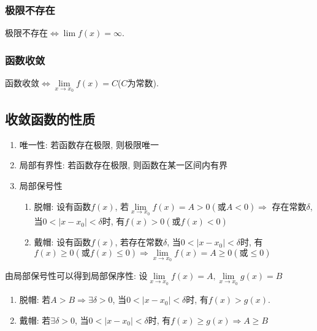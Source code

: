 \subsubsection{极限不存在}
极限不存在$ \Leftrightarrow \lim\limits f(x)=\infty $.
\subsubsection{函数收敛}
函数收敛$ \Leftrightarrow \lim\limits_{x \rightarrow x_{0}}f(x)=C $($ C $为常数).
\subsection{收敛函数的性质}
\begin{enumerate}
\item 唯一性: 若函数存在极限, 则极限唯一
\item 局部有界性: 若函数存在极限, 则函数在某一区间内有界
\item 局部保号性
\begin{enumerate}
\item 脱帽: 设有函数$ f(x) $, 若$ \lim\limits_{x\rightarrow x_{0}}f(x)=A>0(\text{或}A<0) \Rightarrow $ 存在常数$ \delta $, 当$ 0<|x-x_{0}|<\delta $时, 有$ f(x)>0(\text{或}f(x)<0) $
\item 戴帽: 设有函数$ f(x) $, 若存在常数$ \delta $, 当$ 0<|x-x_{0}|<\delta $时, 有$ f(x)\ge 0(\text{或}f(x)\le 0) \Rightarrow \lim\limits_{x\rightarrow x_{0}}f(x)=A\ge 0(\text{或}\le 0) $
\end{enumerate}
\end{enumerate}
\begin{tcolorbox}
由局部保号性可以得到局部保序性: 设$ \lim\limits_{x \rightarrow x_{0}}f(x)=A, \lim\limits_{x \rightarrow x_{0}}g(x)=B $
\begin{enumerate}
\item 脱帽: 若$ A>B\Rightarrow \exists \delta>0 $, 当$ 0<|x-x_{0}|<\delta $时, 有$ f(x)>g(x) $.
\item 戴帽: 若$ \exists \delta>0 $, 当$ 0<|x-x_{0}|<\delta $时, 有$ f(x)\ge g(x)\Rightarrow A\ge B $
\end{enumerate}
\end{tcolorbox}

